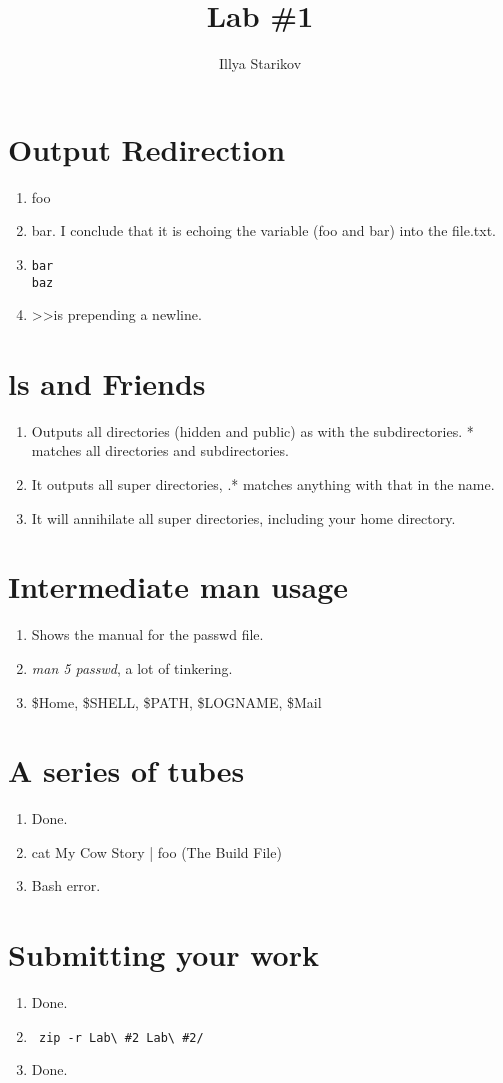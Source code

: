 \documentclass{article}
\begin{document}
\author{Illya Starikov}
\title{Lab \#1}

\maketitle

\section{Output Redirection}
\begin{enumerate}
\item foo
\item bar. I conclude that it is echoing the variable (foo and bar) into the file.txt.
\item \begin{verbatim}
bar
baz
\end{verbatim}
\item \textgreater \textgreater is prepending a newline.
\end{enumerate}

\section{ls and Friends}
\begin{enumerate}
\item Outputs all directories (hidden and public) as with the subdirectories. * matches all directories and subdirectories.
\item It outputs all super directories, .* matches anything with that in the name.
\item It will annihilate all super directories, including your home directory.
\end{enumerate}

\section{Intermediate man usage}
\begin{enumerate}
\item Shows the manual for the passwd file.
\item \textit{man 5 passwd}, a lot of tinkering.
\item \$Home, \$SHELL, \$PATH, \$LOGNAME, \$Mail
\end{enumerate}

\section{A series of tubes}
\begin{enumerate}
\item Done.
\item cat My Cow Story | foo (The Build File)
\item Bash error.
\end{enumerate}

\section{Submitting your work}
\begin{enumerate}
\item Done.
\item \begin{verbatim} zip -r Lab\ #2 Lab\ #2/ \end{verbatim}
\item Done.
\end{enumerate}
\end{document}
